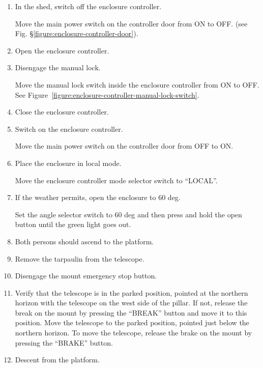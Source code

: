 \begin{enumerate}

\item
In the shed, switch off the enclosure controller.

Move the main power switch on the controller door from ON to OFF.  (see Fig. \S\ref{figure:enclosure-controller-door}).

\item
Open the enclosure controller.

\item
Disengage the manual lock.

Move the manual lock switch inside the enclosure controller from ON to OFF. See Figure~\ref{figure:enclosure-controller-manual-lock-switch}.

\item
Close the enclosure controller.

\item
Switch on the enclosure controller.

Move the main power switch on the controller door from OFF to ON.

\item
Place the enclosure in local mode.

Move the enclosure controller mode selector switch to “LOCAL”.

\item
If the weather permits, open the enclosure to 60 deg.

Set the angle selector switch to 60 deg and then press and hold the open button until the green light goes out.

\item
Both persons should ascend to the platform.

\item
Remove the tarpaulin from the telescope.

\item Disengage the mount emergency stop button.

\item
\ifcoatlioan
Verify that the telescope is in the parked position, pointed at the northern horizon with the telescope on the west side of the pillar. If not, release the break on the mount by pressing the “BREAK” button and move it to this position.
\fi
\ifddotioan
Move the telescope to the parked position, pointed just below the northern horizon. To move the telescope, release the brake on the mount by pressing the “BRAKE” button.
\fi

\item Descent from the platform.


\end{enumerate}
